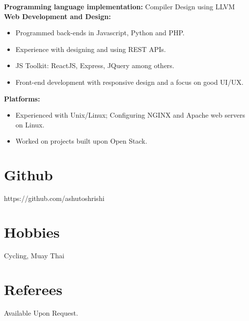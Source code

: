 \documentclass[a4paper,overlapped]{res}
\begin{document}
\begin{resume}
  \textbf{Programming language implementation:} Compiler Design using LLVM \\
  \textbf{Web Development and Design:}
  \begin{itemize}
  \item Programmed back-ends in Javascript, Python and PHP.
  \item Experience with designing and using REST APIs.
  \item JS Toolkit: ReactJS, Express, JQuery among
    others.
  \item Front-end development with responsive design and a focus on good UI/UX.
  \end{itemize}
  \textbf{Platforms:}
  \begin{itemize}
  \item Experienced with Unix/Linux; Configuring NGINX and Apache web servers on
    Linux.
  \item Worked on projects built upon Open Stack. 
  \end{itemize}



  \section{Github} 
  https://github.com/ashutoshrishi 
  \section{Hobbies}
  Cycling, Muay Thai
  
  \section{Referees}
  Available Upon Request.
  
  
\end{resume}
\end{document}
